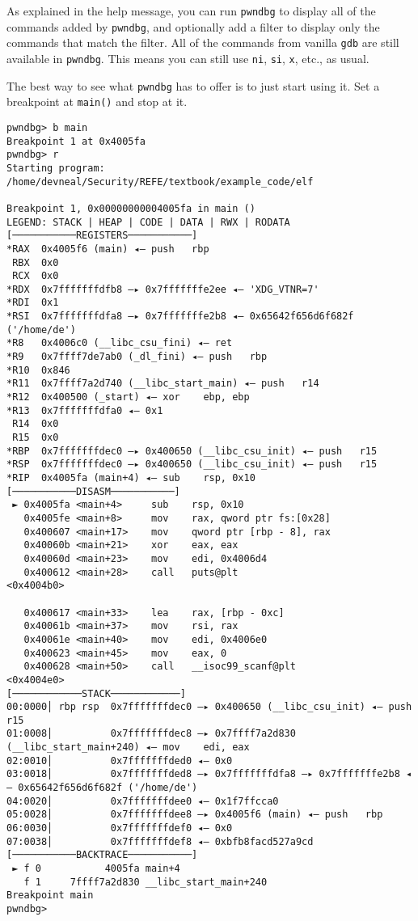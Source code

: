 As explained in the help message, you can run \texttt{pwndbg} to display all of
the commands added by \texttt{pwndbg}, and optionally add a filter to display
only the commands that match the filter. All of the commands from vanilla
\texttt{gdb} are still available in \texttt{pwndbg}. This means you can still
use \texttt{ni}, \texttt{si}, \texttt{x}, etc., as usual.


The best way to see what \texttt{pwndbg} has to offer is to just start using it.
Set a breakpoint at \texttt{main()} and stop at it.

\begin{lstlisting}
pwndbg> b main
Breakpoint 1 at 0x4005fa
pwndbg> r
Starting program: /home/devneal/Security/REFE/textbook/example_code/elf 

Breakpoint 1, 0x00000000004005fa in main ()
LEGEND: STACK | HEAP | CODE | DATA | RWX | RODATA
[───────────REGISTERS───────────]
*RAX  0x4005f6 (main) ◂— push   rbp
 RBX  0x0
 RCX  0x0
*RDX  0x7fffffffdfb8 —▸ 0x7fffffffe2ee ◂— 'XDG_VTNR=7'
*RDI  0x1
*RSI  0x7fffffffdfa8 —▸ 0x7fffffffe2b8 ◂— 0x65642f656d6f682f ('/home/de')
*R8   0x4006c0 (__libc_csu_fini) ◂— ret    
*R9   0x7ffff7de7ab0 (_dl_fini) ◂— push   rbp
*R10  0x846
*R11  0x7ffff7a2d740 (__libc_start_main) ◂— push   r14
*R12  0x400500 (_start) ◂— xor    ebp, ebp
*R13  0x7fffffffdfa0 ◂— 0x1
 R14  0x0
 R15  0x0
*RBP  0x7fffffffdec0 —▸ 0x400650 (__libc_csu_init) ◂— push   r15
*RSP  0x7fffffffdec0 —▸ 0x400650 (__libc_csu_init) ◂— push   r15
*RIP  0x4005fa (main+4) ◂— sub    rsp, 0x10
[───────────DISASM───────────]
 ► 0x4005fa <main+4>     sub    rsp, 0x10
   0x4005fe <main+8>     mov    rax, qword ptr fs:[0x28]
   0x400607 <main+17>    mov    qword ptr [rbp - 8], rax
   0x40060b <main+21>    xor    eax, eax
   0x40060d <main+23>    mov    edi, 0x4006d4
   0x400612 <main+28>    call   puts@plt                      <0x4004b0>
 
   0x400617 <main+33>    lea    rax, [rbp - 0xc]
   0x40061b <main+37>    mov    rsi, rax
   0x40061e <main+40>    mov    edi, 0x4006e0
   0x400623 <main+45>    mov    eax, 0
   0x400628 <main+50>    call   __isoc99_scanf@plt            <0x4004e0>
[────────────STACK────────────]
00:0000│ rbp rsp  0x7fffffffdec0 —▸ 0x400650 (__libc_csu_init) ◂— push   r15
01:0008│          0x7fffffffdec8 —▸ 0x7ffff7a2d830 (__libc_start_main+240) ◂— mov    edi, eax
02:0010│          0x7fffffffded0 ◂— 0x0
03:0018│          0x7fffffffded8 —▸ 0x7fffffffdfa8 —▸ 0x7fffffffe2b8 ◂— 0x65642f656d6f682f ('/home/de')
04:0020│          0x7fffffffdee0 ◂— 0x1f7ffcca0
05:0028│          0x7fffffffdee8 —▸ 0x4005f6 (main) ◂— push   rbp
06:0030│          0x7fffffffdef0 ◂— 0x0
07:0038│          0x7fffffffdef8 ◂— 0xbfb8facd527a9cd
[───────────BACKTRACE───────────]
 ► f 0           4005fa main+4
   f 1     7ffff7a2d830 __libc_start_main+240
Breakpoint main
pwndbg> 
\end{lstlisting}

